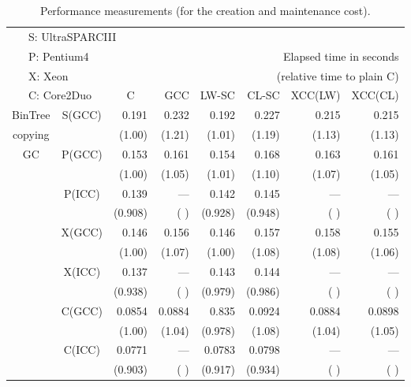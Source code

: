 \documentclass[a4j]{jarticle}
\begin{document}
\begin{table*}[!t]
\caption{Performance measurements (for the creation and maintenance cost).}
\label{tab:performance}
\begin{center}
\medskip \small
\scriptsize
\begin{tabular}{|c|c|r|r|r|r|r|r|}
\multicolumn{8}{l}{\ \ \  S: UltraSPARCIII} \\
\multicolumn{2}{l}{\ \ \  P: Pentium4} &
\multicolumn{6}{r}{Elapsed time in seconds} \\
\multicolumn{2}{l}{\ \ \  X: Xeon} &
\multicolumn{6}{r}{  (relative time to plain C)} \\
\cline{3-8}
\multicolumn{2}{l|}{\ \ \ C: Core2Duo}
& \multicolumn{1}{c|}{C}     & GCC    & LW-SC  & CL-SC  & XCC(LW)& XCC(CL) \\ \cline{3-8} \hline
BinTree    & S(GCC) & 0.191  & 0.232  & 0.192  & 0.227  & 0.215  & 0.215 \\  
copying    &        & (1.00) & (1.21) & (1.01) & (1.19) & (1.13) & (1.13)\\ \cline{2-8}
  GC       & P(GCC) & 0.153  & 0.161  & 0.154  & 0.168  & 0.163  & 0.161 \\ 
           &        & (1.00) & (1.05) & (1.01) & (1.10) & (1.07) & (1.05)\\ \cline{2-8}
           & P(ICC) & 0.139  & ---    & 0.142  & 0.145  & ---    & ---   \\ 
           &        & (0.908)& (    ) & (0.928)& (0.948)& (    ) & (    )\\ \cline{2-8}
           & X(GCC) & 0.146  & 0.156  & 0.146  & 0.157  & 0.158  & 0.155 \\ 
           &        & (1.00) & (1.07) & (1.00) & (1.08) & (1.08) & (1.06)\\ \cline{2-8}
           & X(ICC) & 0.137  & ---    & 0.143  & 0.144  & ---    & ---   \\ 
           &        & (0.938)& (    ) & (0.979)& (0.986)& (    ) & (    )\\ \cline{2-8}
           & C(GCC) & 0.0854 & 0.0884 & 0.835  & 0.0924 & 0.0884 & 0.0898\\ 
           &        & (1.00) & (1.04) & (0.978)& (1.08) & (1.04) & (1.05)\\ \cline{2-8}
           & C(ICC) & 0.0771 & ---    & 0.0783 & 0.0798 & ---    & ---   \\ 
           &        & (0.903)& (    ) & (0.917)& (0.934)& (    ) & (    )\\ \hline

\end{tabular}
\end{center}
\end{table*}
\end{document}

